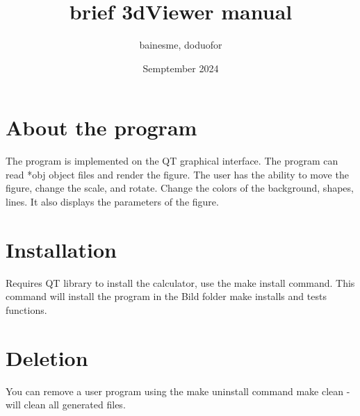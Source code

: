 \documentclass[12pt, a4paper]{article}
\title{brief 3dViewer manual}
\author{bainesme, doduofor}
\date{Semptember 2024}
\begin{document}
\maketitle


\pagebreak

\section{About the program}





The program is implemented on the QT graphical interface.
The program can read *obj object files and render the figure.
The user has the ability to move the figure, change the scale, and rotate.
Change the colors of the background, shapes, lines.
It also displays the parameters of the figure.

\pagebreak

\section{Installation}

Requires QT library to install the calculator, use the make install command.
This command will install the program in the Bild folder make installs and tests functions.

\pagebreak

\section{Deletion}

You can remove a user program using the make uninstall command make clean - will clean all generated files.
\end{document}
